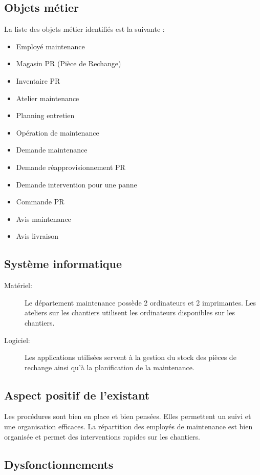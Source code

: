 \subsection{Objets métier}

La liste des objets métier identifiés est la suivante :
\begin{itemize}
\item Employé maintenance
\item Magasin PR (Pièce de Rechange)
\item Inventaire PR
\item Atelier maintenance
\item Planning entretien
\item Opération de maintenance
\item Demande maintenance
\item Demande réapprovisionnement PR
\item Demande intervention pour une panne
\item Commande PR
\item Avis maintenance
\item Avis livraison
\end{itemize}

\subsection{Système informatique}

\begin{description}
\item [Matériel:]\el
Le département maintenance possède 2 ordinateurs et 2 imprimantes.
Les ateliers sur les chantiers utilisent les ordinateurs disponibles sur les
chantiers.

\item [Logiciel:]\el
Les applications utilisées servent à la gestion du stock des pièces de
rechange ainsi qu'à la planification de la maintenance.
\end{description}

\subsection{Aspect positif de l'existant}

Les procédures sont bien en place et bien pensées. Elles permettent un suivi
et une organisation efficaces.
La répartition des employés de maintenance est bien organisée et permet
des interventions rapides sur les chantiers.

\subsection{Dysfonctionnements}

